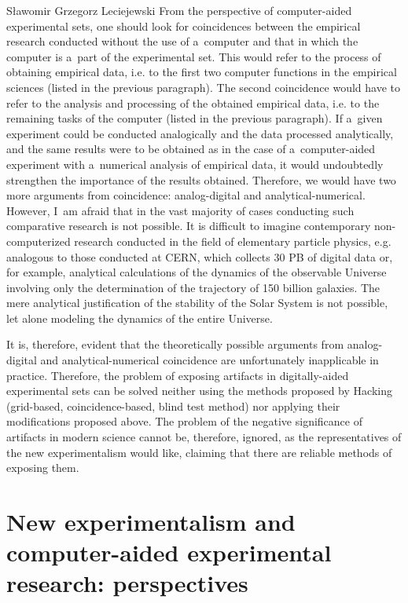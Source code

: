 \begin{artengenv}{Sławomir Grzegorz Leciejewski}
From the perspective of computer-aided experimental sets, one should look for coincidences between the empirical research conducted without the use of a~computer and that in which the computer is a~part of the experimental set. This would refer to the process of obtaining empirical data, i.e. to the first two computer functions in the empirical sciences (listed in the previous paragraph). The second coincidence would have to refer to the analysis and processing of the obtained empirical data, i.e. to the remaining tasks of the computer (listed in the previous paragraph). If a~given experiment could be conducted analogically and the data processed analytically, and the same results were to be obtained as in the case of a~computer-aided experiment with a~numerical analysis of empirical data, it would undoubtedly strengthen the importance of the results obtained. Therefore, we would have two more arguments from coincidence: analog-digital and analytical-numerical. However, I~am afraid that in the vast majority of cases conducting such comparative research is not possible. It is difficult to imagine contemporary non-computerized research conducted in the field of elementary particle physics, e.g. analogous to those conducted at CERN, which collects 30 PB of digital data 
\parencite[][]{leciejewski_digital_2015} %
 or, for example, analytical calculations of the dynamics of the observable Universe involving only the determination of the trajectory of 150 billion galaxies. The mere analytical justification of the stability of the Solar System is not possible, let alone modeling the dynamics of the entire Universe.



It is, therefore, evident that the theoretically possible arguments from analog-digital and analytical-numerical coincidence are unfortunately inapplicable in practice. Therefore, the problem of exposing artifacts in digitally-aided experimental sets can be solved neither using the methods proposed by Hacking (grid-based, coincidence-based, blind test method) nor applying their modifications proposed above. The problem of the negative significance of artifacts in modern science cannot be, therefore, ignored, as the representatives of the new experimentalism would like, claiming that there are reliable methods of exposing them.



\section*{New experimentalism and computer-aided experimental research: perspectives}


\end{artengenv}
